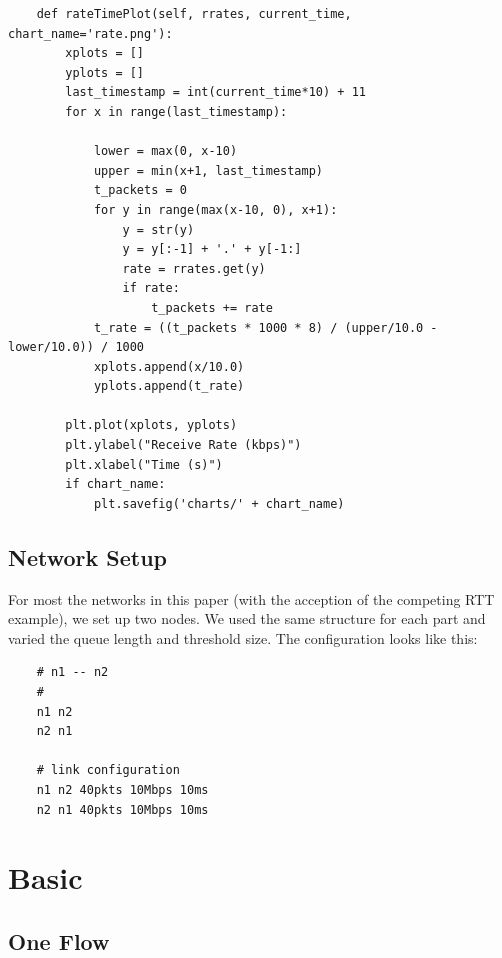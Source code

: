 \documentclass[11pt]{article}
\begin{document}
\begin{lstlisting}
    def rateTimePlot(self, rrates, current_time, chart_name='rate.png'):
        xplots = []
        yplots = []
        last_timestamp = int(current_time*10) + 11
        for x in range(last_timestamp):

            lower = max(0, x-10)
            upper = min(x+1, last_timestamp)
            t_packets = 0
            for y in range(max(x-10, 0), x+1):
                y = str(y)
                y = y[:-1] + '.' + y[-1:]
                rate = rrates.get(y)
                if rate:
                    t_packets += rate
            t_rate = ((t_packets * 1000 * 8) / (upper/10.0 - lower/10.0)) / 1000
            xplots.append(x/10.0)
            yplots.append(t_rate)

        plt.plot(xplots, yplots)
        plt.ylabel("Receive Rate (kbps)")
        plt.xlabel("Time (s)")
        if chart_name:
            plt.savefig('charts/' + chart_name)
\end{lstlisting}

\vspace{5mm}

\subsection{Network Setup}

For most the networks in this paper (with the acception of the competing RTT example), we set up two nodes. We used the same structure for each part and varied the queue length and threshold size. The configuration looks like this:

\vspace{5mm}

\begin{lstlisting}
    # n1 -- n2
    #
    n1 n2
    n2 n1

    # link configuration
    n1 n2 40pkts 10Mbps 10ms
    n2 n1 40pkts 10Mbps 10ms
\end{lstlisting}

\vspace{5mm}

\section{Basic}

\subsection{One Flow}
\end{document}
